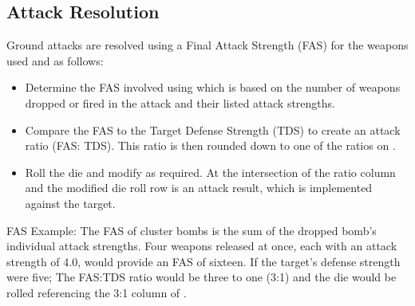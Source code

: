 \subsection{Attack Resolution}



Ground attacks are resolved using a Final Attack Strength (FAS) for the weapons used and  as follows:
\begin{itemize}
\item Determine the FAS involved using  which is based on the number of weapons dropped or fired in the attack and their listed attack strengths. 
\item Compare the FAS to the Target Defense Strength (TDS) to create an attack ratio (FAS: TDS). This ratio is then rounded down to one of the ratios on .
\item Roll the die and modify as required. At the intersection of the ratio column and the modified die roll row is an attack result, which is implemented against the target.
\end{itemize}

FAS Example: The FAS of cluster bombs is the sum of the dropped bomb's individual attack strengths. Four weapons released at once, each with an attack strength of 4.0, would provide an FAS of sixteen. If the target's defense strength were five; The FAS:TDS ratio would be three to one (3:1) and the die would be rolled referencing the 3:1 column of .

